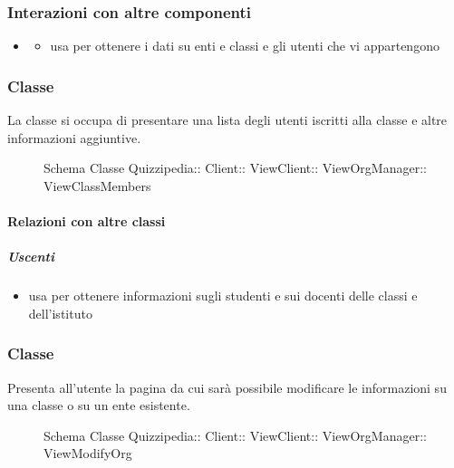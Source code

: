 \subsubsection{Interazioni con altre componenti}
\begin{itemize}
\item {}
\begin{itemize}
\item usa  per ottenere i dati su enti e classi e gli utenti che vi appartengono
\end{itemize}
\end{itemize}
\subsubsection{Classe }
La classe si occupa di presentare una lista degli utenti iscritti alla classe e altre informazioni aggiuntive.
\begin{figure}[H]
\centering
\noindent{}
\caption[Schema Classe ViewClassMembers]{Schema Classe Quizzipedia:: Client:: ViewClient:: ViewOrgManager:: ViewClassMembers}
\end{figure}
\paragraph{Relazioni con altre classi}
\subparagraph{Uscenti}
\begin{itemize}
\item usa  per ottenere informazioni sugli studenti e sui docenti delle classi e dell'istituto
\end{itemize}
\subsubsection{Classe }
Presenta all'utente la pagina da cui sarà possibile modificare le informazioni su una classe o su un ente esistente.
\begin{figure}[H]
\centering
\noindent{}
\caption[Schema Classe ViewModifyOrg]{Schema Classe Quizzipedia:: Client:: ViewClient:: ViewOrgManager:: ViewModifyOrg}
\end{figure}
